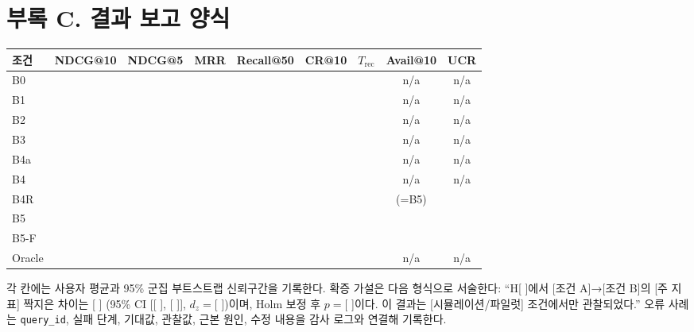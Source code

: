 \documentclass[10pt,twocolumn,letterpaper]{article}
\newcommand{\fillin}[1]{\textcolor{fillc}{[#1]}}
\begin{document}
\section*{부록 C. 결과 보고 양식}
\begin{center}\small
\setlength{\tabcolsep}{6pt}
\renewcommand{\arraystretch}{1.15}
\begin{tabular}{@{}lcccccccc@{}}
\toprule
조건 & NDCG@10 & NDCG@5 & MRR & Recall@50 & CR@10 & $T_{\mathrm{rec}}$ & Avail@10 & UCR \\
\midrule
B0 & & & & & & & n/a & n/a \\
B1 & & & & & & & n/a & n/a \\
B2 & & & & & & & n/a & n/a \\
B3 & & & & & & & n/a & n/a \\
B4a & & & & & & & n/a & n/a \\
B4 & & & & & & & n/a & n/a \\
B4R & & & & & & & (=B5) & \\
B5 & & & & & & & & \\
B5-F & & & & & & & & \\
Oracle & & & & & & & n/a & n/a \\
\bottomrule
\end{tabular}
\end{center}
각 칸에는 사용자 평균과 95\% 군집 부트스트랩 신뢰구간을 기록한다. 확증 가설은 다음 형식으로 서술한다: ``H\fillin{ }에서 \fillin{조건 A}→\fillin{조건 B}의 \fillin{주 지표} 짝지은 차이는 \fillin{ } (95\% CI [\fillin{ }, \fillin{ }], $d_z=$\fillin{ })이며, Holm 보정 후 $p=$\fillin{ }이다. 이 결과는 \fillin{시뮬레이션/파일럿} 조건에서만 관찰되었다.'' 오류 사례는 \texttt{query\_id}, 실패 단계, 기대값, 관찰값, 근본 원인, 수정 내용을 감사 로그와 연결해 기록한다.
\end{document}
